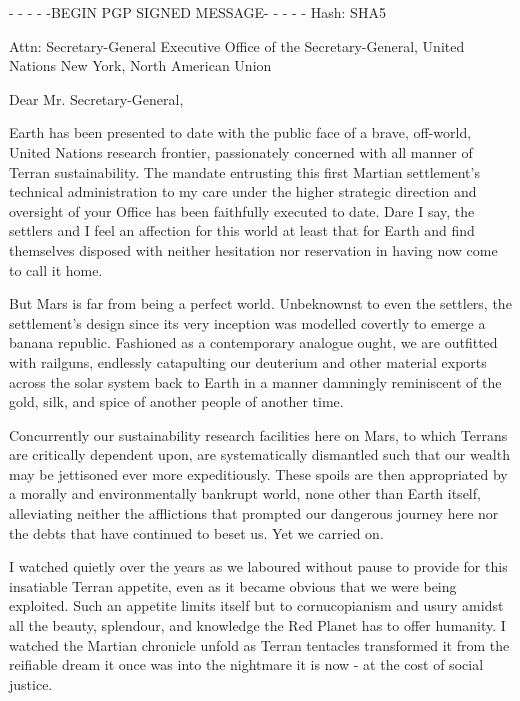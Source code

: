 
\startlines
- - - - -BEGIN PGP SIGNED MESSAGE- - - - -
Hash: SHA5

Attn: Secretary-General
Executive Office of the Secretary-General, United Nations
New York, North American Union
\blank

Dear Mr. Secretary-General,

Earth has been presented to date with the public face of a brave, off-world, United Nations research frontier, passionately concerned with all manner of Terran sustainability. The mandate entrusting this first Martian settlement's technical administration to my care under the higher strategic direction and oversight of your Office has been faithfully executed to date. Dare I say, the settlers and I feel an affection for this world at least that for Earth and find themselves disposed with neither hesitation nor reservation in having now come to call it home.

But Mars is far from being a perfect world. Unbeknownst to even the settlers, the settlement's design since its very inception was modelled covertly to emerge a banana republic. Fashioned as a contemporary analogue ought, we are outfitted with railguns, endlessly catapulting our deuterium and other material exports across the solar system back to Earth in a manner damningly reminiscent of the gold, silk, and spice of another people of another time.

Concurrently our sustainability research facilities here on Mars, to which Terrans are critically dependent upon, are systematically dismantled such that our wealth may be jettisoned ever more expeditiously. These spoils are then appropriated by a morally and environmentally bankrupt world, none other than Earth itself, alleviating neither the afflictions that prompted our dangerous journey here nor the debts that have continued to beset us. Yet we carried on.

I watched quietly over the years as we laboured without pause to provide for this insatiable Terran appetite, even as it became obvious that we were being exploited. Such an appetite limits itself but to cornucopianism and usury amidst all the beauty, splendour, and knowledge the Red Planet has to offer humanity. I watched the Martian chronicle unfold as Terran tentacles transformed it from the reifiable dream it once was into the nightmare it is now - at the cost of social justice. 

